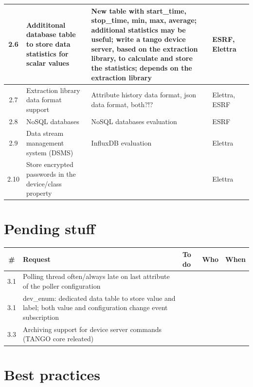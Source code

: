 \documentclass[11pt,a4paper]{article}
\begin{document}
\begin{longtable}{|c|p{6.0cm}|p{6.0cm}|p{1.0cm}|p{1.4cm}|}
	\hline
	2.6 &
	Addititonal database table to store data statistics for scalar
	values &
	New table with start\_time, stop\_time, min, max, average;
	additional statistics may be useful; write a tango device server,
	based on the extraction library, to calculate and store the
	statistics; depends on the extraction library &
	ESRF, Elettra &
	\\
	\hline
	2.7 &
	Extraction library data format support &
	Attribute history data format, json data format, both?!? &
	Elettra, ESRF &
	\\
	\hline
	2.8 &
	NoSQL databases &
	NoSQL databases evaluation &
	ESRF &
	\\
	\hline
	2.9 &
	Data stream management system (DSMS) &
	InfluxDB evaluation &
	Elettra &
	\\
	\hline
	2.10 &
	Store encrypted passwords in the device/class property &
	&
	Elettra &
	\\
	\hline
\end{longtable}

\newpage

\section{Pending stuff}

\begin{longtable}{|c|p{6.0cm}|p{6.0cm}|p{1.0cm}|p{1.4cm}|}
	\hline
	\bf{\#} & \bf{Request} & \bf{To do} & \bf{Who} & \bf{When} \\
	\hline
	\endhead
	3.1 &
	Polling thread often/always late on last attribute of the poller
	configuration &
	&
	&
	\\
	\hline
	3.1 &
	dev\_enum: dedicated data table to store value and label; both value
	and configuration change event subscription &
	&
	&
	\\
	\hline
	3.3 &
	Archiving support for device server commands (TANGO core releated) &
	&
	&
	\\
	\hline
\end{longtable}

\section{Best practices}
\end{document}
